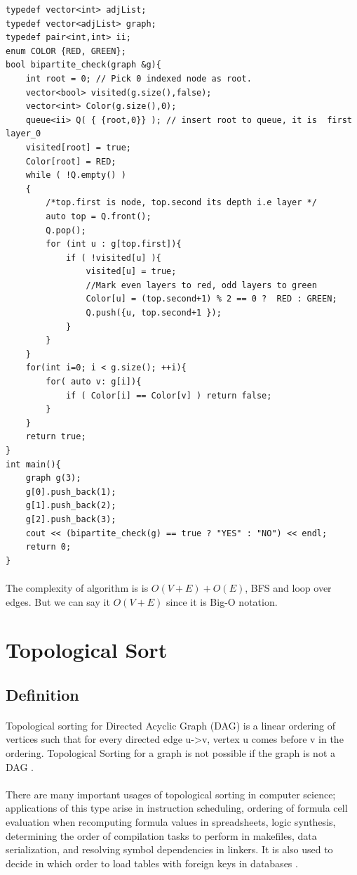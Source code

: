 \documentclass[12pt]{article}
\begin{document}
\newpage
\begin{verbatim}
typedef vector<int> adjList;
typedef vector<adjList> graph;
typedef pair<int,int> ii;
enum COLOR {RED, GREEN};
bool bipartite_check(graph &g){
    int root = 0; // Pick 0 indexed node as root.
    vector<bool> visited(g.size(),false);
    vector<int> Color(g.size(),0); 
    queue<ii> Q( { {root,0}} ); // insert root to queue, it is  first layer_0
    visited[root] = true;
    Color[root] = RED;
    while ( !Q.empty() )
    {
        /*top.first is node, top.second its depth i.e layer */
        auto top = Q.front();
        Q.pop();
        for (int u : g[top.first]){
            if ( !visited[u] ){
                visited[u] = true;
                //Mark even layers to red, odd layers to green
                Color[u] = (top.second+1) % 2 == 0 ?  RED : GREEN; 
                Q.push({u, top.second+1 });
            }
        }
    }
    for(int i=0; i < g.size(); ++i){
        for( auto v: g[i]){
            if ( Color[i] == Color[v] ) return false;
        }
    }
    return true;
}
int main(){
    graph g(3);
    g[0].push_back(1);
    g[1].push_back(2);
    g[2].push_back(3);
    cout << (bipartite_check(g) == true ? "YES" : "NO") << endl;
    return 0;
}
\end{verbatim}
\paragraph{}
The complexity of algorithm is is $O(V + E) + O(E) $, BFS and loop over edges. But we can say it  $O(V+E)$ since it is Big-O notation. \\ 
\section{Topological Sort}
\subsection{Definition}
\paragraph{}Topological sorting for Directed Acyclic Graph (DAG) is a linear ordering of vertices such that for every directed edge u->v, vertex u comes before v in the ordering. Topological Sorting for a graph is not possible if the graph is not a DAG \cite{6}.

\paragraph{}
 There are many important usages of topological sorting in computer science; applications of this type arise in instruction scheduling, ordering of formula cell evaluation when recomputing formula values in spreadsheets, logic synthesis, determining the order of compilation tasks to perform in makefiles, data serialization, and resolving symbol dependencies in linkers. It is also used to decide in which order to load tables with foreign keys in databases \cite{3}. 
 
\end{document}
